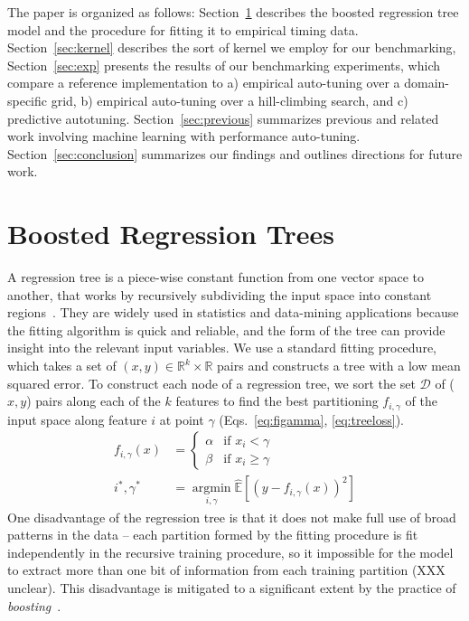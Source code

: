 \documentclass{sig-alternate}
\begin{document}
The paper is organized as follows:
Section~\ref{sec:brtree} describes the boosted regression tree model and the procedure for fitting it to empirical timing data.
Section~\ref{sec:kernel} describes the sort of kernel we employ for our benchmarking,
Section~\ref{sec:exp} presents the results of our benchmarking experiments, which
compare a reference implementation to a) empirical auto-tuning over a domain-specific grid,
b) empirical auto-tuning over a hill-climbing search, and
c) predictive autotuning.
Section~\ref{sec:previous} summarizes previous and related work involving  machine learning with performance auto-tuning.
Section~\ref{sec:conclusion} summarizes our findings and outlines directions for future work.


\section{Boosted Regression Trees}
\label{sec:brtree}

A regression tree is a piece-wise constant function from one vector space to another,
that works by recursively subdividing the input space into constant regions~\citep{breiman, textbook?}.
They are widely used in statistics and data-mining applications because the fitting algorithm is quick and reliable, and the form of the tree can provide insight into the relevant input variables.
We use a standard fitting procedure, which takes a set of
$(x, y)\in \mathbb{R}^k \times \mathbb{R}$ pairs and constructs a tree with a low mean squared error.
To construct each node of a regression tree,
we sort the set $\mathcal{D}$ of ($x,y$) pairs along each of the $k$ features to find the best partitioning $f_{i,\gamma}$ of the input space along feature $i$ at point $\gamma$ (Eqs.~\ref{eq:figamma}, \ref{eq:treeloss}).
\begin{align}
    f_{i,\gamma}(x) &=
    \begin{cases}
        \alpha  &\text{if $x_i < \gamma$} \\
        \beta &\text{if $x_i \geq \gamma$}
    \end{cases}
    \label{eq:figamma}\\
    i^*, \gamma^* &= \operatorname*{argmin}_{i, \gamma} \mathbb{\hat E}\left[ (y - f_{i,\gamma}(x))^2 \right]
    \label{eq:treeloss}
\end{align}
One disadvantage of the regression tree is that it does not make full use of broad patterns in the data -- each partition formed by the fitting procedure is fit independently in the recursive training procedure,
so it impossible for the model to extract more than one bit of information from each training partition (XXX unclear).
This disadvantage is mitigated to a significant extent by the practice of {\em boosting}~\citet{XXX}.
\end{document}
